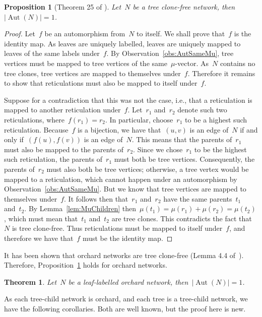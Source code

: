 \documentclass{article}
\newtheorem{theorem}{Theorem}
\newtheorem{proposition}{Proposition}
\theoremstyle{definition}
\DeclareMathOperator{\Aut}{Aut}
\begin{document}
\begin{proposition}[Theorem 25 of \cite{murakami2021thesis}]
\label{prop:TCFTrivAut}
Let~$N$ be a tree clone-free network, then~$|\Aut(N)| = 1$.
\end{proposition}
\begin{proof}
Let~$f$ be an automorphism from~$N$ to itself. We shall prove that~$f$ is the identity map.
As leaves are uniquely labelled, leaves are uniquely mapped to leaves of the same labels under~$f$.
By Observation~\ref{obs:AutSameMu}, tree vertices must be mapped to tree vertices of the same~$\mu$-vector. As~$N$ contains no tree clones, tree vertices are mapped to themselves under~$f$.
Therefore it remains to show that reticulations must also be mapped to itself under~$f$.

Suppose for a contradiction that this was not the case, i.e., that a reticulation is mapped to another reticulation under~$f$. 
Let~$r_1$ and~$r_2$ denote such two reticulations, where~$f(r_1) = r_2$.
In particular, choose~$r_1$ to be a highest such reticulation.
Because~$f$ is a bijection, we have that~$(u,v)$ is an edge of~$N$ if and only if~$(f(u),f(v))$ is an edge of~$N$.
This means that the parents of~$r_1$ must also be mapped to the parents of~$r_2$.
Since we chose~$r_1$ to be the highest such reticulation, the parents of~$r_1$ must both be tree vertices. 
Consequently, the parents of~$r_2$ must also both be tree vertices; otherwise, a tree vertex would be mapped to a reticulation, which cannot happen under an automorphism by Observation~\ref{obs:AutSameMu}.
But we know that tree vertices are mapped to themselves under~$f$.
It follows then that~$r_1$ and~$r_2$ have the same parents~$t_1$ and~$t_2$.
By Lemma~\ref{lem:MuChildren} then~$\mu(t_1) = \mu(r_1) + \mu(r_2) = \mu(t_2)$, which must mean that~$t_1$ and~$t_2$ are tree clones.
This contradicts the fact that~$N$ is tree clone-free.
Thus reticulations must be mapped to itself under~$f$, and therefore we have that~$f$ must be the identity map.
\end{proof}


It has been shown that orchard networks are tree clone-free (Lemma 4.4 of~\cite{bai2021defining}).
Therefore, Proposition~\ref{prop:TCFTrivAut} holds for orchard networks.

\begin{theorem}\label{the:OrchardTrivAut}
Let~$N$ be a leaf-labelled orchard network, then~$|\Aut(N)| = 1$.
\end{theorem}

As each tree-child network is orchard, and each tree is a tree-child network, we have the following corollaries. Both are well known, but the proof here is new.
\end{document}
